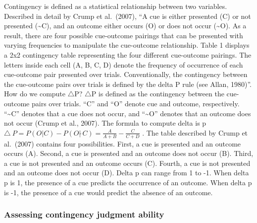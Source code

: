 \documentclass[
  english,
  man,floatsintext]{apa6}
\begin{document}
Contingency is defined as a statistical relationship between two variables. Described in detail by Crump et al.~(2007), \enquote{A cue is either presented (C) or not presented (\textasciitilde C), and an outcome either occurs (O) or does not occur (\textasciitilde O). As a result, there are four possible cue-outcome pairings that can be presented with varying frequencies to manipulate the cue-outcome relationship. Table 1 displays a 2x2 contingency table representing the four different cue-outcome pairings. The letters inside each cell (A, B, C, D) denote the frequency of occurrence of each cue-outcome pair presented over trials. Conventionally, the contingency between the cue-outcome pairs over trials is defined by the delta P rule (see Allan, 1980)}. How do we compute \(\triangle\)P? \(\triangle\)P is defined as the contingency between the cue-outcome pairs over trials. \enquote{C} and \enquote{O} denote cue and outcome, respectively. \enquote{\textasciitilde C} denotes that a cue does not occur, and \enquote{\textasciitilde O} denotes that an outcome does not occur (Crump et al., 2007). The formula to compute delta is p \(\triangle\ P = P(O|C) - P(O| \tilde\ C) = \frac{A}{A+B} - \frac{C}{C+D}\) . The table described by Crump et al.~(2007) contains four possibilities. First, a cue is presented and an outcome occurs (A). Second, a cue is presented and an outcome does not occur (B). Third, a cue is not presented and an outcome occurs (C). Fourth, a cue is not presented and an outcome does not occur (D). Delta p can range from 1 to -1. When delta p is 1, the presence of a cue predicts the occurrence of an outcome. When delta p is -1, the presence of a cue would predict the absence of an outcome.

\hypertarget{assessing-contingency-judgment-ability}{%
\subsubsection{Assessing contingency judgment ability}\label{assessing-contingency-judgment-ability}}
\end{document}
